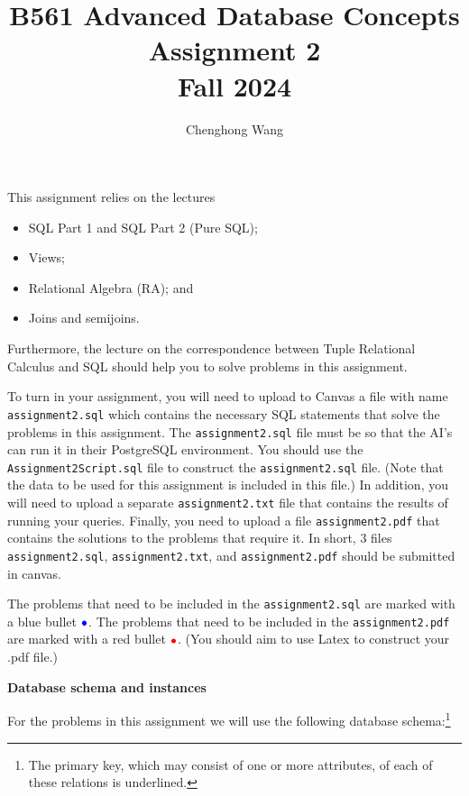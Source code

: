 \documentclass[11pt]{article}
\newcommand{\red}[1]{{\color{red}#1}}
\newcommand{\blue}[1]{{\color{blue}#1}}
\newcommand{\redbullet}{$\red{\bullet}$}
\newcommand{\bluebullet}{$\blue{\bullet}$}
\begin{document}
\title{B561 Advanced Database Concepts \\Assignment 2 \\Fall 2024}
\author{Chenghong Wang}
\date{}
\maketitle

This {assignment} relies on the lectures
\begin{itemize}
\item SQL Part 1 and SQL Part 2 (Pure SQL);
\item Views;
\item Relational Algebra (RA);  and 
\item Joins and semijoins. 
\end{itemize}

Furthermore, the lecture on the correspondence between Tuple Relational Calculus and SQL should help you to solve problems in this assignment.

To turn in your assignment, you will need to upload to Canvas a file with name {\tt assignment2.sql} which contains 
the necessary SQL statements that solve the problems in this assignment.   
The {\tt assignment2.sql} file must be so that the AI's can run it in their PostgreSQL environment.  
You should use the {\tt Assignment2Script.sql} file to construct the {\tt assignment2.sql} file. (Note that the data to be used for this assignment is included in this file.)
In addition, you will need to upload a separate {\tt assignment2.txt} file that contains the results of running
your queries.
Finally, you need to upload a file {\tt assignment2.pdf} that contains the solutions to the problems that require it.
In short, 3 files {\tt assignment2.sql}, {\tt assignment2.txt}, and {\tt assignment2.pdf} should be submitted in canvas.


The problems that need to be included in the {\tt assignment2.sql} are marked with a blue bullet \bluebullet.
The problems that need to be included in the {\tt assignment2.pdf} are marked with a red bullet \redbullet.
(You should aim to use Latex to construct your .pdf file.)

\newpage
\noindent
\large{\bf Database schema and instances}
\bigskip




For the problems in this assignment we will use the following database schema:\footnote{The primary key, which may consist of one or more attributes, of each of these relations is underlined.}
\end{document}

